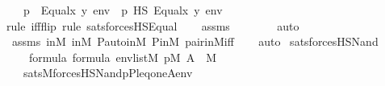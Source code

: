 \begin{isabellebody}
\ \ \ {\isachardoublequoteopen}p\ {\isasymtturnstile}\ Equal{\isacharparenleft}{\kern0pt}x{\isacharcomma}{\kern0pt}\ y{\isacharparenright}{\kern0pt}\ env\ {\isasymlongleftrightarrow}\ p\ {\isasymtturnstile}HS\ Equal{\isacharparenleft}{\kern0pt}x{\isacharcomma}{\kern0pt}\ y{\isacharparenright}{\kern0pt}\ env{\isachardoublequoteclose}\ \isanewline
%
\isadelimproof
\ \ %
\endisadelimproof
%
\isatagproof
{}\isamarkupfalse%
{\isacharparenleft}{\kern0pt}rule\ iff{\isacharunderscore}{\kern0pt}flip{\isacharcomma}{\kern0pt}\ rule\ sats{\isacharunderscore}{\kern0pt}forcesHS{\isacharunderscore}{\kern0pt}Equal{\isacharparenright}{\kern0pt}\isanewline
\ \ \isamarkupfalse%
\ assms\isanewline
\ \ \ \ \ \ \isamarkupfalse%
\ auto{\isacharbrackleft}{\kern0pt}{}{\isacharbrackright}{\kern0pt}\isanewline
\ \ \isamarkupfalse%
\ assms\ {\isasymF}{\isacharunderscore}{\kern0pt}in{\isacharunderscore}{\kern0pt}M\ {\isasymG}{\isacharunderscore}{\kern0pt}in{\isacharunderscore}{\kern0pt}M\ P{\isacharunderscore}{\kern0pt}auto{\isacharunderscore}{\kern0pt}in{\isacharunderscore}{\kern0pt}M\ P{\isacharunderscore}{\kern0pt}in{\isacharunderscore}{\kern0pt}M\ pair{\isacharunderscore}{\kern0pt}in{\isacharunderscore}{\kern0pt}M{\isacharunderscore}{\kern0pt}iff\isanewline
\ \ \isamarkupfalse%
\ auto%
\endisatagproof
{\isafoldproof}%
%
\isadelimproof
\isanewline
%
\endisadelimproof
\isanewline
{}\isamarkupfalse%
\ sats{\isacharunderscore}{\kern0pt}forcesHS{\isacharunderscore}{\kern0pt}Nand\ {\isacharcolon}{\kern0pt}\isanewline
\ \ \ \ {\isachardoublequoteopen}{\isasymphi}{\isasymin}formula{\isachardoublequoteclose}\ {\isachardoublequoteopen}{\isasympsi}{\isasymin}formula{\isachardoublequoteclose}\ {\isachardoublequoteopen}env{\isasymin}list{\isacharparenleft}{\kern0pt}M{\isacharparenright}{\kern0pt}{\isachardoublequoteclose}\ {\isachardoublequoteopen}p{\isasymin}M{\isachardoublequoteclose}\ {\isachardoublequoteopen}A\ {\isasymin}\ M{\isachardoublequoteclose}\ \isanewline
\ \ \ {\isachardoublequoteopen}sats{\isacharparenleft}{\kern0pt}M{\isacharcomma}{\kern0pt}forcesHS{\isacharparenleft}{\kern0pt}Nand{\isacharparenleft}{\kern0pt}{\isasymphi}{\isacharcomma}{\kern0pt}{\isasympsi}{\isacharparenright}{\kern0pt}{\isacharparenright}{\kern0pt}{\isacharcomma}{\kern0pt}{\isacharbrackleft}{\kern0pt}p{\isacharcomma}{\kern0pt}P{\isacharcomma}{\kern0pt}leq{\isacharcomma}{\kern0pt}one{\isacharcomma}{\kern0pt}A{\isacharbrackright}{\kern0pt}{\isacharat}{\kern0pt}env{\isacharparenright}{\kern0pt}\ {\isasymlongleftrightarrow}\isanewline

\end{isabellebody}
